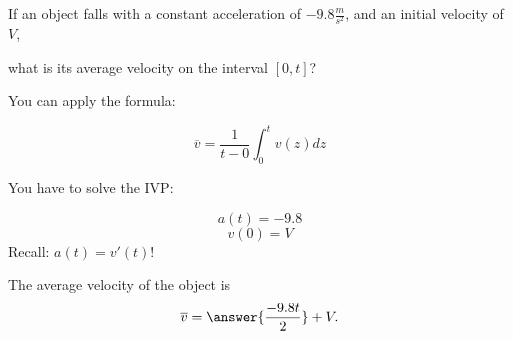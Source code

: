 \documentclass{ximera}
\author{Steven Gubkin\and Nela Lakos}
\begin{document}
\begin{exercise}

If an object falls with a constant acceleration of $-9.8 \frac{m}{s^2}$, and an initial velocity of $V$, 

what is its average velocity on the interval $[0,t]$?


\begin{hint}
You can apply the formula:

\[
\overline{v}=\frac{1}{t-0}\int_0^{t}v(z) dz
\]
\end{hint}

\begin{hint}
You have to solve the IVP:

\[
a(t)=-9.8
\]
\[
v(0)=V
\]
Recall: $a(t)=v'(t)$!
\end{hint}


\begin{prompt}
	The average velocity of the object is 
	\[
	\overline{v}=\answer{\frac{-9.8t}{2}}+V.
	\]
\end{prompt}
\end{exercise}
\end{document}
